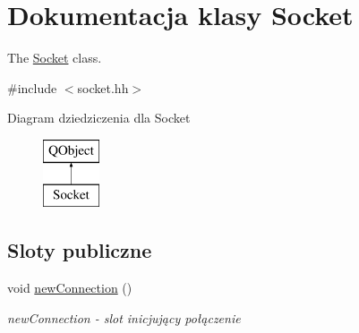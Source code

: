 \hypertarget{class_socket}{}\section{Dokumentacja klasy Socket}
\label{class_socket}


The \hyperlink{class_socket}{Socket} class.  




{\ttfamily \#include $<$socket.\+hh$>$}

Diagram dziedziczenia dla Socket\begin{figure}[H]
\begin{center}
\leavevmode
\includegraphics[height=2.000000cm]{class_socket}
\end{center}
\end{figure}
\subsection*{Sloty publiczne}
\begin{DoxyCompactItemize}
\item 
void \hyperlink{class_socket_ae7f0dec57cf59312e51ad2ba29a66cb3}{new\+Connection} ()\hypertarget{class_socket_ae7f0dec57cf59312e51ad2ba29a66cb3}{}\label{class_socket_ae7f0dec57cf59312e51ad2ba29a66cb3}

\begin{DoxyCompactList}\small\item\em new\+Connection -\/ slot inicjujący połączenie \end{DoxyCompactList}\end{DoxyCompactItemize}
